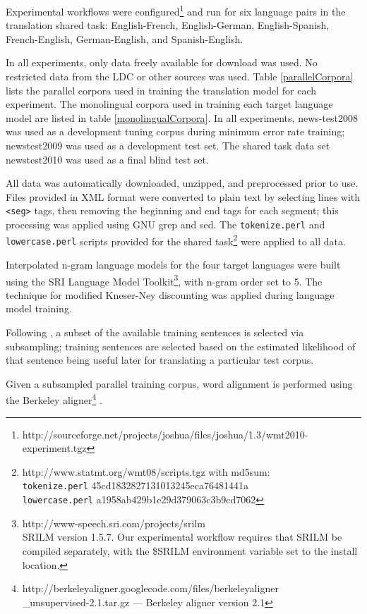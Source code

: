 \documentclass[11pt]{article}
\begin{document}
Experimental workflows were configured\footnote{http://sourceforge.net/projects/joshua/files/joshua/1.3/wmt2010-experiment.tgz} and run for six language pairs in the translation shared task: English-French, English-German, English-Spanish, French-English, German-English, and Spanish-English. 

In all experiments, only data freely available for download was used. No restricted data from the LDC or other sources was used. Table \ref{parallelCorpora} lists the parallel corpora used in training the translation model for each experiment. The monolingual corpora used in training each target language model are listed in table \ref{monolingualCorpora}. In all experiments, news-test2008 was used as a development tuning corpus during minimum error rate training; newstest2009 was used as a development test set. The shared task data set newstest2010 was used as a final blind test set.

All data was automatically downloaded, unzipped, and preprocessed prior to use. Files provided in XML format were converted to plain text by selecting lines with {\tt <seg>} tags, then removing the beginning and end tags for each segment; this processing was applied using GNU grep and sed. The {\tt tokenize.perl} and {\tt lowercase.perl} scripts provided for the shared task\footnote{http://www.statmt.org/wmt08/scripts.tgz with md5sum: \\ {\tt tokenize.perl} 45cd1832827131013245eca76481441a \\ {\tt lowercase.perl} a1958ab429b1e29d379063c3b9cd7062} were applied to all data.

Interpolated n-gram language models for the four target languages were built using the SRI Language Model Toolkit\footnote{ http://www-speech.sri.com/projects/srilm \\ SRILM version 1.5.7. Our experimental workflow requires that SRILM be compiled separately, with the \$SRILM environment variable set to the install location.}, with n-gram order set to 5. The  technique for modified Kneser-Ney discounting \cite{Kneser1995} was applied during language model training.

Following , a subset of the available training sentences is selected via subsampling; training sentences are selected based on the estimated likelihood of that sentence being useful later for translating a particular test corpus. 


Given a subsampled parallel training corpus, word alignment is performed using the Berkeley aligner\footnote{http://berkeleyaligner.googlecode.com/files/berkeleyaligner\\\_unsupervised-2.1.tar.gz --- Berkeley aligner version 2.1} \cite{liang06alignment}. 
\end{document}
